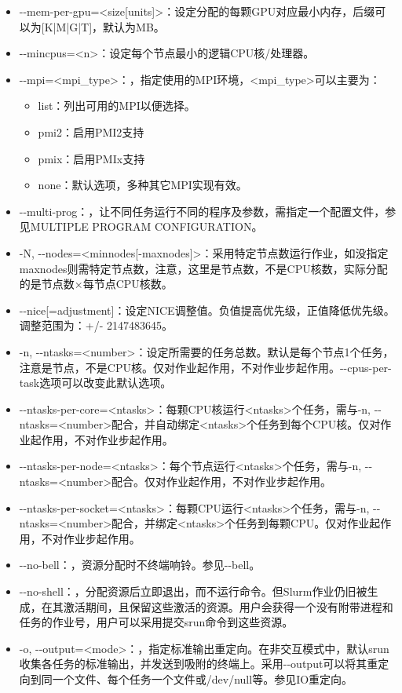 \begin{itemize}
    \item -{}-mem-per-gpu=<size[units]>：设定分配的每颗GPU对应最小内存，后缀可以为[K|M|G|T]，默认为MB。
	\item -{}-mincpus=<n>：设定每个节点最小的逻辑CPU核/处理器。
	\item -{}-mpi=<mpi\_type>：，指定使用的MPI环境，<mpi\_type>可以主要为：
	\begin{itemize}
		\item list：列出可用的MPI以便选择。
		\item pmi2：启用PMI2支持
		\item pmix：启用PMIx支持
		\item none：默认选项，多种其它MPI实现有效。
	\end{itemize}
	\item -{}-multi-prog：，让不同任务运行不同的程序及参数，需指定一个配置文件，参见MULTIPLE PROGRAM CONFIGURATION。
	\item -N, -{}-nodes=<minnodes[-maxnodes]>：采用特定节点数运行作业，如没指定maxnodes则需特定节点数，注意，这里是节点数，不是CPU核数，实际分配的是节点数×每节点CPU核数。
    \item -{}-nice[=adjustment]：设定NICE调整值。负值提高优先级，正值降低优先级。调整范围为：+/- 2147483645。
    \item -n, -{}-ntasks=<number>：设定所需要的任务总数。默认是每个节点1个任务，注意是节点，不是CPU核。仅对作业起作用，不对作业步起作用。-{}-cpus-per-task选项可以改变此默认选项。
	\item -{}-ntasks-per-core=<ntasks>：每颗CPU核运行<ntasks>个任务，需与-n, -{}-ntasks=<number>配合，并自动绑定<ntasks>个任务到每个CPU核。仅对作业起作用，不对作业步起作用。
	\item -{}-ntasks-per-node=<ntasks>：每个节点运行<ntasks>个任务，需与-n, -{}-ntasks=<number>配合。仅对作业起作用，不对作业步起作用。
	\item -{}-ntasks-per-socket=<ntasks>：每颗CPU运行<ntasks>个任务，需与-n, -{}-ntasks=<number>配合，并绑定<ntasks>个任务到每颗CPU。仅对作业起作用，不对作业步起作用。
   \item -{}-no-bell：，资源分配时不终端响铃。参见-{}-bell。
   \item -{}-no-shell：，分配资源后立即退出，而不运行命令。但Slurm作业仍旧被生成，在其激活期间，且保留这些激活的资源。用户会获得一个没有附带进程和任务的作业号，用户可以采用提交srun命令到这些资源。
	\item -o, -{}-output=<mode>：，指定标准输出重定向。在非交互模式中，默认srun收集各任务的标准输出，并发送到吸附的终端上。采用-{}-output可以将其重定向到同一个文件、每个任务一个文件或/dev/null等。参见IO重定向。

\end{itemize}
